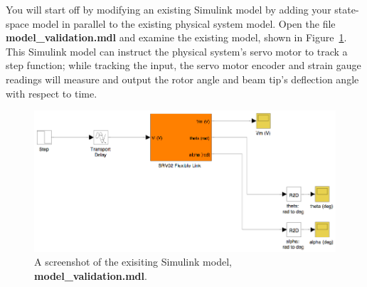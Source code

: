 \documentclass[12pt]{report}
\begin{document}
You will start off by modifying an existing Simulink model by adding your state-space model in parallel to the existing physical system model. Open the file \\ \textbf{model\_validation.mdl} and examine the existing model, shown in Figure~\ref{fig:lab1_model_validation_student}. This Simulink model can instruct the physical system's servo motor to track a step function; while tracking the input, the servo motor encoder and strain gauge readings will measure and output the rotor angle and beam tip's deflection angle with respect to time.
\begin{figure}[htb!]
    \centering
    \includegraphics[width=.7\linewidth]{eps/lab_1/model_validation_student.eps}
    \caption{A screenshot of the exisiting Simulink model, \textbf{model\_validation.mdl}.}
    \label{fig:lab1_model_validation_student}
\end{figure}
\end{document}
